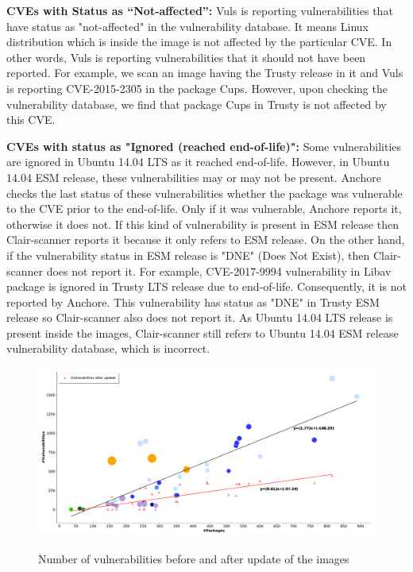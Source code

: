 \documentclass[a4paper,num-refs]{oup-contemporary}
\begin{document}
\textbf{CVEs with Status as “Not-affected”:} Vuls is reporting vulnerabilities that have status
as "not-affected" in the vulnerability database. It means Linux distribution which is inside the image is not affected
by the particular CVE. In other words, Vuls is reporting vulnerabilities that it should not have been reported.
For example, we scan an image having the Trusty release in it and Vuls is reporting CVE-2015-2305
in the package Cups. However, upon checking the vulnerability database, we find that package Cups in Trusty is not
affected by this CVE.

\textbf{CVEs with status as "Ignored (reached end-of-life)":}
Some vulnerabilities are ignored in Ubuntu 14.04 LTS as it reached end-of-life. 
However, in Ubuntu 14.04 ESM release, these vulnerabilities may or may not be present.
Anchore checks the last status of these vulnerabilities whether the package was vulnerable to the CVE
prior to the end-of-life. Only if it was vulnerable, Anchore reports it, otherwise it does not.
If this kind of vulnerability is present in ESM release then Clair-scanner reports it because it
only refers to ESM release. On the other hand, if the vulnerability
status in ESM release is "DNE" (Does Not Exist), then Clair-scanner does not report it. 
For example, CVE-2017-9994 vulnerability in Libav package is ignored in Trusty LTS release due to end-of-life.
Consequently, it is not reported by Anchore. This vulnerability has status as "DNE" in Trusty ESM
release so Clair-scanner also does not report it. As Ubuntu 14.04 LTS release is present inside the images,
Clair-scanner still refers to Ubuntu 14.04 ESM release vulnerability database, which is incorrect.

\begin{figure}[!ht]
        {\includegraphics[width=\textwidth]
        {Figures/vulnwithupdate.pdf}}
	\vspace*{-7mm}
        \caption{\label{fig:graph2} Number of vulnerabilities before and
        after update of the images}
      \end{figure}
\end{document}
